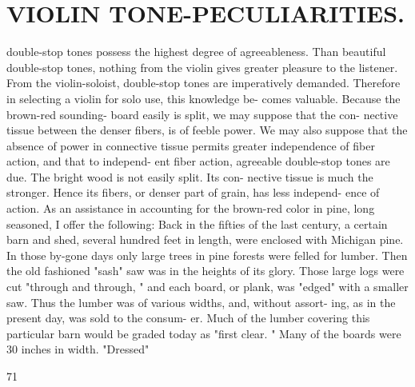 \documentclass{article}
\begin{document}
\section*{VIOLIN TONE-PECULIARITIES.}
double-stop tones possess the highest degree of agreeableness. Than beautiful double-stop tones, nothing from the violin gives greater pleasure to the listener. From the violin-soloist, double-stop tones are imperatively demanded. Therefore in selecting a violin for solo use, this knowledge be- comes valuable. Because the brown-red sounding- board easily is split, we may suppose that the con- nective tissue between the denser fibers, is of feeble power. We may also suppose that the absence of power in connective tissue permits greater independence of fiber action, and that to independ- ent fiber action, agreeable double-stop tones are due. The bright wood is not easily split. Its con- nective tissue is much the stronger. Hence its fibers, or denser part of grain, has less independ- ence of action. As an assistance in accounting for the brown-red color in pine, long seasoned, I offer the following: Back in the fifties of the last century, a certain barn and shed, several hundred feet in length, were enclosed with Michigan pine. In those by-gone days only large trees in pine forests were felled for lumber. Then the old fashioned "sash" saw was in the heights of its glory. Those large logs were cut "through and through, " and each board, or plank, was "edged" with a smaller saw. Thus the lumber was of various widths, and, without assort- ing, as in the present day, was sold to the consum- er. Much of the lumber covering this particular barn would be graded today as "first clear. " Many of the boards were 30 inches in width. "Dressed"

71
\end{document}
